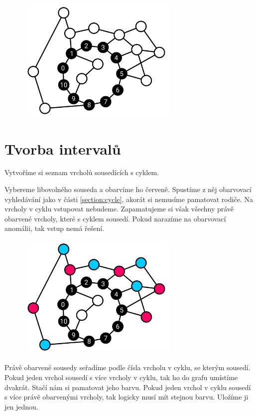 \documentclass{article}
\begin{document}
\begin{figure}[H]
    \centering
    \includegraphics[height=6cm]{cycle/empty.pdf}
\end{figure}

\section{Tvorba intervalů}
\label{section:interval-construction}

Vytvoříme si seznam vrcholů sousedících s cyklem.

Vybereme libovolného souseda a obarvíme ho červeně. Spustíme z něj obarvovací vyhledávání jako v části \ref{section:cycle}, akorát si nemusíme pamatovat rodiče. Na vrcholy v cyklu vstupovat nebudeme. Zapamatujeme si však všechny právě obarvené vrcholy, které s cyklem sousedí. Pokud narazíme na obarvovací anomálii, tak vstup nemá řešení.

\begin{figure}[H]
    \centering
    \includegraphics[height=6cm]{cycle/first.pdf}
\end{figure}

Právě obarvené sousedy seřadíme podle čísla vrcholu v cyklu, se kterým sousedí. Pokud jeden vrchol sousedí s více vrcholy v cyklu, tak ho do grafu umístíme dvakrát. Stačí nám si pamatovat jeho barvu. Pokud jeden vrchol v cyklu sousedí s více právě obarvenými vrcholy, tak logicky musí mít stejnou barvu. Uložíme ji jen jednou.
\end{document}
